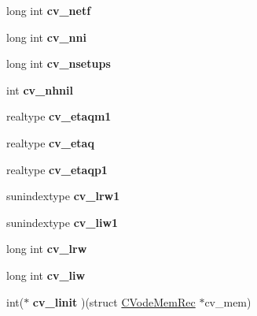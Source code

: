 \begin{DoxyCompactItemize}
\mbox{\label{structCVodeMemRec_a8a935781755c700838150b59b254f7de}} 
long int {\bfseries cv\+\_\+netf}
\item 
\mbox{\label{structCVodeMemRec_af9f032fbfa28b763ea5ab1245b8fb8d8}} 
long int {\bfseries cv\+\_\+nni}
\item 
\mbox{\label{structCVodeMemRec_a8eac758e8593ab99bf4621686af3c08c}} 
long int {\bfseries cv\+\_\+nsetups}
\item 
\mbox{\label{structCVodeMemRec_a2bdabe5813041460867a5513f989605d}} 
int {\bfseries cv\+\_\+nhnil}
\item 
\mbox{\label{structCVodeMemRec_a44b3c60d26752bb188ab84356b8b2b69}} 
realtype {\bfseries cv\+\_\+etaqm1}
\item 
\mbox{\label{structCVodeMemRec_a38c00409c617b57ecc4fe329569b3612}} 
realtype {\bfseries cv\+\_\+etaq}
\item 
\mbox{\label{structCVodeMemRec_aaa8821a4a13394e3443c43e165f68fae}} 
realtype {\bfseries cv\+\_\+etaqp1}
\item 
\mbox{\label{structCVodeMemRec_a2257ea355dda32d51947a453f00c41b8}} 
sunindextype {\bfseries cv\+\_\+lrw1}
\item 
\mbox{\label{structCVodeMemRec_aaf4f1bf9b239d58a3d8d533e2b23b5e4}} 
sunindextype {\bfseries cv\+\_\+liw1}
\item 
\mbox{\label{structCVodeMemRec_a1c5e09e6cae29aaf55e0c0823137291c}} 
long int {\bfseries cv\+\_\+lrw}
\item 
\mbox{\label{structCVodeMemRec_a2b17fc655bf1b2e47bead0903c49da4f}} 
long int {\bfseries cv\+\_\+liw}
\item 
\mbox{\label{structCVodeMemRec_afb00122cb65de444ff5d6b22f9bc187b}} 
int($\ast$ {\bfseries cv\+\_\+linit} )(struct \mbox{\hyperlink{structCVodeMemRec}{C\+Vode\+Mem\+Rec}} $\ast$cv\+\_\+mem)

\end{DoxyCompactItemize}
